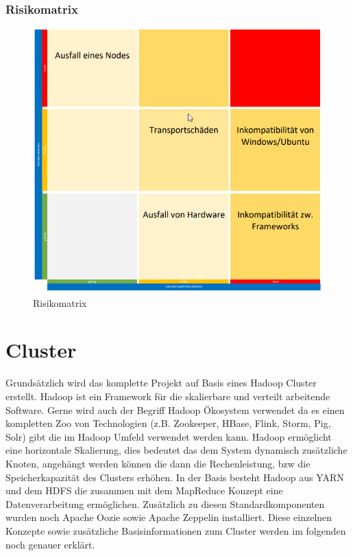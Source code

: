 \documentclass[12pt,oneside,a4paper,parskip]{scrbook}
\begin{document}
\subsection{Risikomatrix}
\begin{figure}[h!]
\caption{Risikomatrix}
\label{risikoMatrix}
\centering
\includegraphics[scale=1.0]{images/risikoanalyse.png}
\end{figure} 


\chapter{Cluster}
Grunds\"atzlich wird das komplette Projekt auf Basis eines Hadoop Cluster erstellt. Hadoop ist ein Framework f\"ur die skalierbare und verteilt arbeitende Software. Gerne wird auch der Begriff  Hadoop \"Okosystem verwendet da es einen kompletten Zoo von Technologien (z.B. Zookeeper, HBase, Flink, Storm, Pig, Solr) gibt die im Hadoop Umfeld verwendet werden kann. Hadoop erm\"oglicht eine horizontale Skalierung, dies bedeutet das dem System dynamisch zus\"atzliche Knoten, angeh\"angt werden k\"onnen die dann die Rechenleistung, bzw die Speicherkapazit\"at des Clusters erh\"ohen. In der Basis besteht Hadoop aus YARN und dem HDFS die zusammen mit dem MapReduce Konzept eine Datenverarbeitung erm\"oglichen. Zus\"atzlich zu diesen Standardkomponenten wurden noch Apache Oozie sowie Apache Zeppelin installiert. Diese einzelnen Konzepte sowie zus\"atzliche Basisinformationen zum Cluster werden im folgenden noch genauer erkl\"art.
\end{document}

